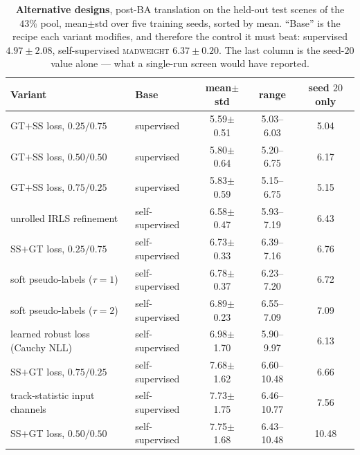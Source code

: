 \documentclass[10pt,twocolumn,letterpaper]{article}
\newcommand{\mad}{\textsc{madweight}}
\begin{document}
\begin{table}[h]\centering\footnotesize
\caption{\textbf{Alternative designs}, post-BA translation on the held-out test scenes of
the $43\%$ pool, mean$\pm$std over five training seeds, sorted by mean. ``Base'' is the
recipe each variant modifies, and therefore the control it must beat: supervised
$4.97\pm2.08$, self-supervised \mad{} $6.37\pm0.20$. The last column is the seed-$20$
value alone --- what a single-run screen would have reported.}
\label{tab:altdesigns}
\setlength{\tabcolsep}{4pt}%
\begin{tabular}{llccc}
\toprule
Variant & Base & mean$\pm$std & range & seed $20$ only\\
\midrule
GT$+$SS loss, $0.25/0.75$ & supervised & 5.59$\pm$0.51 & 5.03--6.03 & 5.04\\
GT$+$SS loss, $0.50/0.50$ & supervised & 5.80$\pm$0.64 & 5.20--6.75 & 6.17\\
GT$+$SS loss, $0.75/0.25$ & supervised & 5.83$\pm$0.59 & 5.15--6.75 & 5.15\\
unrolled IRLS refinement & self-supervised & 6.58$\pm$0.47 & 5.93--7.19 & 6.43\\
SS$+$GT loss, $0.25/0.75$ & self-supervised & 6.73$\pm$0.33 & 6.39--7.16 & 6.76\\
soft pseudo-labels ($\tau{=}1$) & self-supervised & 6.78$\pm$0.37 & 6.23--7.20 & 6.72\\
soft pseudo-labels ($\tau{=}2$) & self-supervised & 6.89$\pm$0.23 & 6.55--7.09 & 7.09\\
learned robust loss (Cauchy NLL) & self-supervised & 6.98$\pm$1.70 & 5.90--9.97 & 6.13\\
SS$+$GT loss, $0.75/0.25$ & self-supervised & 7.68$\pm$1.62 & 6.60--10.48 & 6.66\\
track-statistic input channels & self-supervised & 7.73$\pm$1.75 & 6.46--10.77 & 7.56\\
SS$+$GT loss, $0.50/0.50$ & self-supervised & 7.75$\pm$1.68 & 6.43--10.48 & 10.48\\
\bottomrule
\end{tabular}
\end{table}
\end{document}
